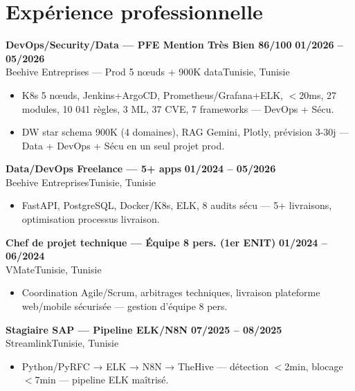 \documentclass[a4paper,10pt]{article}
\newcommand{\cventry}[4]{\textbf{#1} \hfill \textbf{#4}\\[1pt]#2{\ifx\relax#3\relax\else, #3\fi}\par\vspace{2pt}}
\begin{document}
\section{Expérience professionnelle}
\cventry{DevOps/Security/Data — PFE Mention Très Bien 86/100}{Beehive Entreprises — Prod 5 nœuds + 900K data}{Tunisie}{01/2026 -- 05/2026}
\begin{itemize}
  \item K8s 5 nœuds, Jenkins+ArgoCD, Prometheus/Grafana+ELK, $<$20ms, 27 modules, 10 041 règles, 3 ML, 37 CVE, 7 frameworks — DevOps + Sécu.
  \item DW star schema 900K (4 domaines), RAG Gemini, Plotly, prévision 3-30j — Data + DevOps + Sécu en un seul projet prod.
\end{itemize}
\cventry{Data/DevOps Freelance — 5+ apps}{Beehive Entreprises}{Tunisie}{01/2024 -- 05/2026}
\begin{itemize}
  \item FastAPI, PostgreSQL, Docker/K8s, ELK, 8 audits sécu — 5+ livraisons, optimisation processus livraison.
\end{itemize}
\cventry{Chef de projet technique — Équipe 8 pers. (1er ENIT)}{VMate}{Tunisie}{01/2024 -- 06/2024}
\begin{itemize}
  \item Coordination Agile/Scrum, arbitrages techniques, livraison plateforme web/mobile sécurisée — gestion d'équipe 8 pers.
\end{itemize}
\cventry{Stagiaire SAP — Pipeline ELK/N8N}{Streamlink}{Tunisie}{07/2025 -- 08/2025}
\begin{itemize}
  \item Python/PyRFC → ELK → N8N → TheHive — détection $<$2min, blocage $<$7min — pipeline ELK maîtrisé.
\end{itemize}
\end{document}
